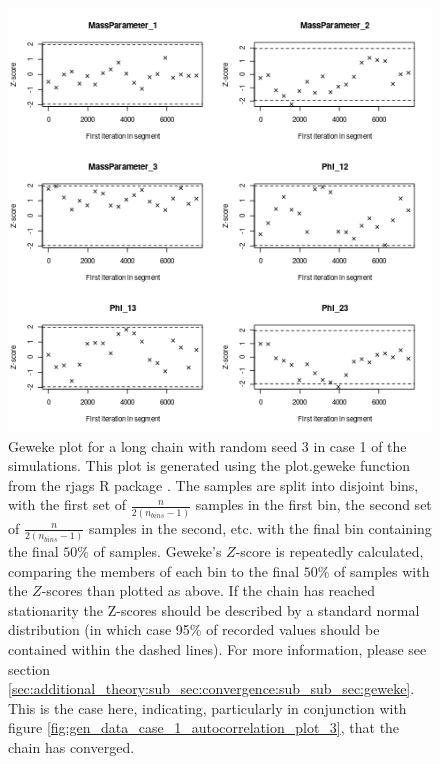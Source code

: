 \documentclass[12pt]{article} %
\begin{document}
	\begin{figure}[!htb]
		\centering
		\includegraphics[scale=0.65]{Images/Gen_data/Case_1/Geweke_plot_3.png}
		\caption{Geweke plot \cite{GewekeEvaluatingAccuracySamplingBased} for a long chain with random seed 3 in case 1 of the simulations. 	This plot is generated using the plot.geweke function from the rjags R package \cite{PlummerRjags2018}. The samples are split into disjoint bins, with the first set of $\frac{n}{2(n_{bins} -1)}$ samples in the first bin, the second set of $\frac{n}{2(n_{bins} -1)}$ samples in the second, etc. with the final bin containing the final $50\%$ of samples. Geweke's $Z$-score \cite{GewekeEvaluatingAccuracySamplingBased} is repeatedly calculated, comparing the members of each bin to the final $50\%$ of samples with the $Z$-scores than plotted as above. If the chain has reached stationarity the Z-scores should be described by a standard normal distribution (in which case 95\% of recorded values should be contained within the dashed lines). For more information, please see section \ref{sec:additional_theory:sub_sec:convergence:sub_sub_sec:geweke}. This is the case here, indicating, particularly in conjunction with figure \ref{fig:gen_data_case_1_autocorrelation_plot_3}, that the chain has converged.}
		\label{fig:gen_data_case_1_geweke_plot_3}
	\end{figure}
		
	
\end{document}
